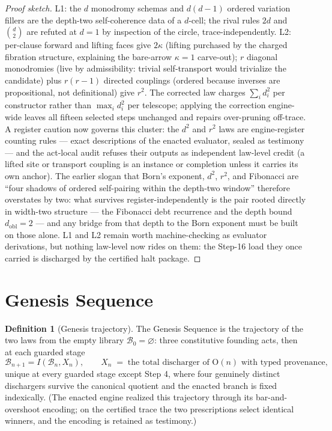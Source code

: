 \documentclass[11pt]{article}
\theoremstyle{plain}
\theoremstyle{definition}
\newtheorem{definition}[theorem]{Definition}
\theoremstyle{remark}
\newenvironment{proofsketch}{\begin{proof}[Proof sketch]}{\end{proof}}
\newcommand{\B}{\mathcal{B}}
\begin{document}
\begin{proofsketch}
L1: the \(d\) monodromy schemas and \(d(d-1)\) ordered variation fillers are the depth-two self-coherence data of a \(d\)-cell; the rival rules \(2d\) and \(\binom{d}{2}\) are refuted at \(d=1\) by inspection of the circle, trace-independently. L2: per-clause forward and lifting faces give \(2\kappa\) (lifting purchased by the charged fibration structure, explaining the bare-arrow \(\kappa=1\) carve-out); \(r\) diagonal monodromies (live by admissibility: trivial self-transport would trivialize the candidate) plus \(r(r-1)\) directed couplings (ordered because inverses are propositional, not definitional) give \(r^2\). The corrected law charges \(\sum_i d_i^2\) per constructor rather than \(\max_i d_i^2\) per telescope; applying the correction engine-wide leaves all fifteen selected steps unchanged and repairs over-pruning off-trace. A register caution now governs this cluster: the \(d^2\) and \(r^2\) laws are engine-register counting rules --- exact descriptions of the enacted evaluator, sealed as testimony --- and the act-local audit refuses their outputs as independent law-level credit (a lifted site or transport coupling is an instance or completion unless it carries its own anchor). The earlier slogan that Born's exponent, \(d^2\), \(r^2\), and Fibonacci are ``four shadows of ordered self-pairing within the depth-two window'' therefore overstates by two: what survives register-independently is the pair rooted directly in width-two structure --- the Fibonacci debt recurrence and the depth bound \(d_{\mathrm{obl}}=2\) --- and any bridge from that depth to the Born exponent must be built on those alone. L1 and L2 remain worth machine-checking as evaluator derivations, but nothing law-level now rides on them: the Step-16 load they once carried is discharged by the certified halt package.
\end{proofsketch}

\section{Genesis Sequence}

\begin{definition}[Genesis trajectory]
The Genesis Sequence is the trajectory of the two laws from the empty library \(\B_0=\varnothing\): three constitutive founding acts, then at each guarded stage
\[
\B_{n+1}=I(\B_n,X_n),
\qquad
X_n \;=\; \text{the total discharger of } \mathrm{O}(n) \text{ with typed provenance},
\]
unique at every guarded stage except Step 4, where four genuinely distinct dischargers survive the canonical quotient and the enacted branch is fixed indexically. (The enacted engine realized this trajectory through its bar-and-overshoot encoding; on the certified trace the two prescriptions select identical winners, and the encoding is retained as testimony.)
\end{definition}
\end{document}
